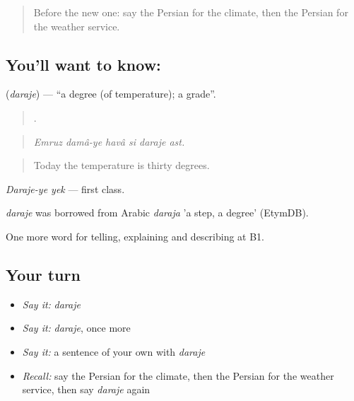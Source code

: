 \label{lesson:FA-C473-daraje}



\begin{quote}
Before the new one: say the Persian for the climate, then the Persian for the weather service.
\end{quote}

\subsection*{You'll want to know: }
\textbf{} (\emph{daraje}) — \textquotedblleft{}a degree (of temperature); a grade\textquotedblright{}.

\begin{quote}
     .
\end{quote}

\begin{quote}
\emph{Emruz damâ-ye havâ si daraje ast.}
\end{quote}

\begin{quote}
Today the temperature is thirty degrees.
\end{quote}

\emph{Daraje-ye yek} — first class.

\begin{cousinweb}
\emph{daraje} was borrowed from Arabic \emph{daraja} 'a step, a degree' (EtymDB).
\end{cousinweb}

\begin{grammarlens}[title={What you've built}]
One more word for telling, explaining and describing at B1.
\end{grammarlens}

\subsection*{Your turn}
\begin{itemize}
\raggedright
  \item \emph{Say it:} \emph{daraje}
  \item \emph{Say it:} \emph{daraje}, once more
  \item \emph{Say it:} a sentence of your own with \emph{daraje}
  \item \emph{Recall:} say the Persian for the climate, then the Persian for the weather service, then say \emph{daraje} again
\end{itemize}

